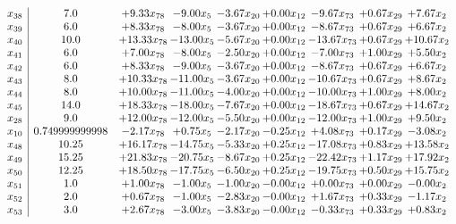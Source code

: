 \documentclass[8pt]{article}
\begin{document}
\[\begin{array}{c| c c@{\hskip 2pt} c@{\hskip 2pt} c@{\hskip 2pt} c@{\hskip 2pt} c@{\hskip 2pt} c@{\hskip 2pt} c@{\hskip 2pt} }
 x_{38}   &  7.0 & +  9.33 x_{78} & -9.00 x_{5} & -3.67 x_{20} & +  0.00 x_{12} & -9.67 x_{73} & +  0.67 x_{29} & +  7.67 x_{2}\\
 x_{39}   &  6.0 & +  8.33 x_{78} & -8.00 x_{5} & -3.67 x_{20} & +  0.00 x_{12} & -8.67 x_{73} & +  0.67 x_{29} & +  6.67 x_{2}\\
 x_{40}   &  10.0 & + 13.33 x_{78} & -13.00 x_{5} & -5.67 x_{20} & +  0.00 x_{12} & -13.67 x_{73} & +  0.67 x_{29} & + 10.67 x_{2}\\
 x_{41}   &  6.0 & +  7.00 x_{78} & -8.00 x_{5} & -2.50 x_{20} & +  0.00 x_{12} & -7.00 x_{73} & +  1.00 x_{29} & +  5.50 x_{2}\\
 x_{42}   &  6.0 & +  8.33 x_{78} & -9.00 x_{5} & -3.67 x_{20} & +  0.00 x_{12} & -8.67 x_{73} & +  0.67 x_{29} & +  6.67 x_{2}\\
 x_{43}   &  8.0 & + 10.33 x_{78} & -11.00 x_{5} & -3.67 x_{20} & +  0.00 x_{12} & -10.67 x_{73} & +  0.67 x_{29} & +  8.67 x_{2}\\
 x_{44}   &  8.0 & + 10.00 x_{78} & -11.00 x_{5} & -4.00 x_{20} & +  0.00 x_{12} & -10.00 x_{73} & +  1.00 x_{29} & +  8.00 x_{2}\\
 x_{45}   &  14.0 & + 18.33 x_{78} & -18.00 x_{5} & -7.67 x_{20} & +  0.00 x_{12} & -18.67 x_{73} & +  0.67 x_{29} & + 14.67 x_{2}\\
 x_{28}   &  9.0 & + 12.00 x_{78} & -12.00 x_{5} & -5.50 x_{20} & +  0.00 x_{12} & -12.00 x_{73} & +  1.00 x_{29} & +  9.50 x_{2}\\
 x_{10}   &  0.749999999998 & -2.17 x_{78} & +  0.75 x_{5} & -2.17 x_{20} & -0.25 x_{12} & +  4.08 x_{73} & +  0.17 x_{29} & -3.08 x_{2}\\
 x_{48}   &  10.25 & + 16.17 x_{78} & -14.75 x_{5} & -5.33 x_{20} & +  0.25 x_{12} & -17.08 x_{73} & +  0.83 x_{29} & + 13.58 x_{2}\\
 x_{49}   &  15.25 & + 21.83 x_{78} & -20.75 x_{5} & -8.67 x_{20} & +  0.25 x_{12} & -22.42 x_{73} & +  1.17 x_{29} & + 17.92 x_{2}\\
 x_{50}   &  12.25 & + 18.50 x_{78} & -17.75 x_{5} & -6.50 x_{20} & +  0.25 x_{12} & -19.75 x_{73} & +  0.50 x_{29} & + 15.75 x_{2}\\
 x_{51}   &  1.0 & +  1.00 x_{78} & -1.00 x_{5} & -1.00 x_{20} & -0.00 x_{12} & +  0.00 x_{73} & +  0.00 x_{29} & -0.00 x_{2}\\
 x_{52}   &  2.0 & +  0.67 x_{78} & -1.00 x_{5} & -2.83 x_{20} & -0.00 x_{12} & +  1.67 x_{73} & +  0.33 x_{29} & -1.17 x_{2}\\
 x_{53}   &  3.0 & +  2.67 x_{78} & -3.00 x_{5} & -3.83 x_{20} & -0.00 x_{12} & -0.33 x_{73} & +  0.33 x_{29} & +  0.83 x_{2}\\

\end{array}\]
\end{document}
